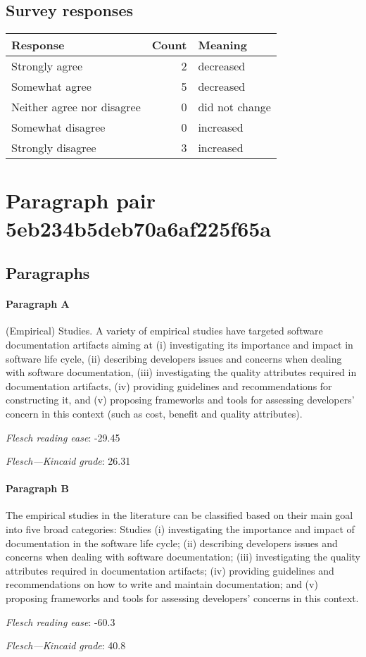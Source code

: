 \subsection{Survey responses}
\begin{tabular}{lrl}
\toprule
          \textbf{Response} &  \textbf{Count} & \textbf{Meaning} \\
\midrule
             Strongly agree &               2 &        decreased \\
             Somewhat agree &               5 &        decreased \\
 Neither agree nor disagree &               0 &   did not change \\
          Somewhat disagree &               0 &        increased \\
          Strongly disagree &               3 &        increased \\
\bottomrule
\end{tabular}

\section{Paragraph pair 5eb234b5deb70a6af225f65a}
\subsection{Paragraphs}
\paragraph{Paragraph A}
(Empirical) Studies. A variety of empirical studies have targeted software documentation artifacts aiming at (i) investigating its importance and impact in software life cycle, (ii) describing developers issues and concerns when dealing with software documentation, (iii) investigating the quality attributes required in documentation artifacts, (iv) providing guidelines and recommendations for constructing it, and (v) proposing frameworks and tools for assessing developers' concern in this context (such as cost, benefit and quality attributes).\par\medskip
\emph{Flesch reading ease}: -29.45\par
\emph{Flesch---Kincaid grade}: 26.31

\paragraph{Paragraph B}
The empirical studies in the literature can be classified based on their main goal into five broad categories: Studies (i) investigating the importance and impact of documentation in the software life cycle; (ii) describing developers issues and concerns when dealing with software documentation; (iii) investigating the quality attributes required in documentation artifacts; (iv) providing guidelines and recommendations on how to write and maintain documentation; and (v) proposing frameworks and tools for assessing developers' concerns in this context.\par\medskip
\emph{Flesch reading ease}: -60.3\par
\emph{Flesch---Kincaid grade}: 40.8

